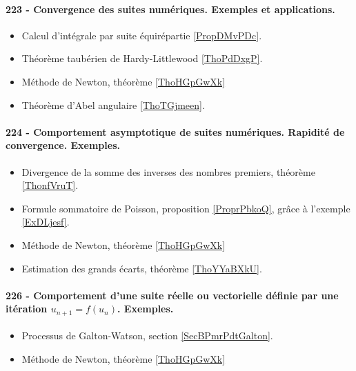 \paragraph{223 - Convergence des suites numériques. Exemples et applications.}
\begin{itemize}
    \item Calcul d'intégrale par suite équirépartie \ref{PropDMvPDc}.
    \item Théorème taubérien de Hardy-Littlewood \ref{ThoPdDxgP}.
    \item Méthode de Newton, théorème \ref{ThoHGpGwXk}
    \item Théorème d'Abel angulaire \ref{ThoTGjmeen}.
\end{itemize}
\paragraph{224 - Comportement asymptotique de suites numériques. Rapidité de convergence. Exemples.}
\begin{itemize}
    \item Divergence de la somme des inverses des nombres premiers, théorème \ref{ThonfVruT}.
    \item Formule sommatoire de Poisson, proposition \ref{ProprPbkoQ}, grâce à l'exemple \ref{ExDLjesf}.
    \item Méthode de Newton, théorème \ref{ThoHGpGwXk}
    \item Estimation des grands écarts, théorème \ref{ThoYYaBXkU}.
\end{itemize}
\paragraph{226 - Comportement d’une suite réelle ou vectorielle définie par une itération \( u_{n+1}=f(u_n)\). Exemples.}
\begin{itemize}
    \item Processus de Galton-Watson, section \ref{SecBPmrPdtGalton}.
    \item Méthode de Newton, théorème \ref{ThoHGpGwXk}
\end{itemize}
